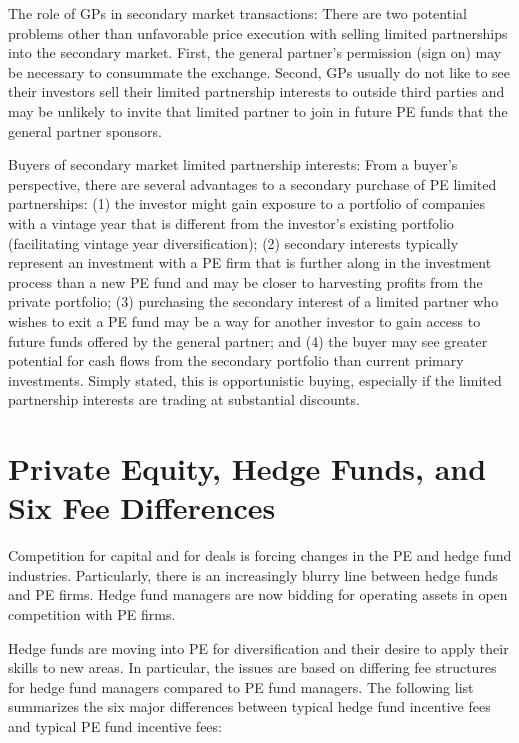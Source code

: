 \documentclass[11pt]{article}
\begin{document}
The role of GPs in secondary market transactions: There are two potential problems other than unfavorable price execution with selling limited partnerships into the secondary market. First, the general partner's permission (sign on) may be necessary to consummate the exchange. Second, GPs usually do not like to see their investors sell their limited partnership interests to outside third parties and may be unlikely to invite that limited partner to join in future PE funds that the general partner sponsors.

Buyers of secondary market limited partnership interests: From a buyer's perspective, there are several advantages to a secondary purchase of PE limited partnerships: (1) the investor might gain exposure to a portfolio of companies with a vintage year that is different from the investor's existing portfolio (facilitating vintage year diversification); (2) secondary interests typically represent an investment with a PE firm that is further along in the investment process than a new PE fund and may be closer to harvesting profits from the private portfolio; (3) purchasing the secondary interest of a limited partner who wishes to exit a PE fund may be a way for another investor to gain access to future funds offered by the general partner; and (4) the buyer may see greater potential for cash flows from the secondary portfolio than current primary investments. Simply stated, this is opportunistic buying, especially if the limited partnership interests are trading at substantial discounts.

\section*{Private Equity, Hedge Funds, and Six Fee Differences}
Competition for capital and for deals is forcing changes in the PE and hedge fund industries. Particularly, there is an increasingly blurry line between hedge funds and PE firms. Hedge fund managers are now bidding for operating assets in open competition with PE firms.

Hedge funds are moving into PE for diversification and their desire to apply their skills to new areas. In particular, the issues are based on differing fee structures for hedge fund managers compared to PE fund managers. The following list summarizes the six major differences between typical hedge fund incentive fees and typical PE fund incentive fees:
\end{document}
